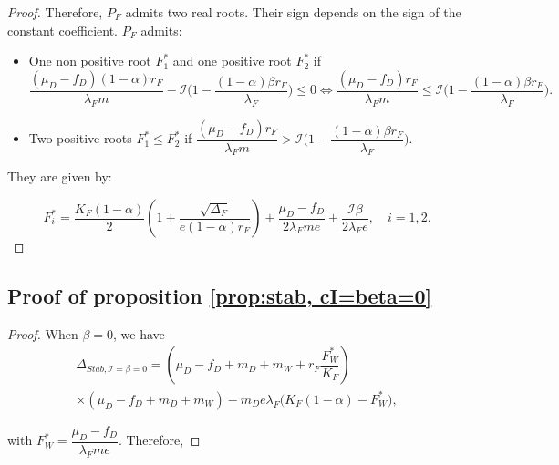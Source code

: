 \documentclass{article}
\newcommand{\lfw}{\lambda_{F}}
\newcommand{\lfw}{\lambda_{F}}
\newcommand{\cI}{\mathcal{I}}
\theoremstyle{definition}
\theoremstyle{remark}
\begin{document}
\begin{appendix}
\begin{proof}
Therefore, $P_F$ admits two real roots. Their sign depends on the sign of the constant coefficient. $P_F$ admits:
\begin{itemize}
\item One non positive root $F^*_1$ and one positive root $F^*_2$ if $$\dfrac{(\mu_D - f_D)(1-\alpha) r_F}{\lfw m} - \cI\Big(1 - \dfrac{(1-\alpha)\beta r_F}{\lfw} \Big) \leq 0 \Leftrightarrow \dfrac{(\mu_D - f_D) r_F}{\lfw m } \leq \cI\Big(1 - \dfrac{(1-\alpha)\beta r_F}{\lfw} \Big).$$
\item Two positive roots $F^*_1\leq  F^*_2$ if $\dfrac{(\mu_D - f_D) r_F}{\lfw m } > \cI\Big(1 - \dfrac{(1-\alpha)\beta r_F}{\lfw} \Big)$.
\end{itemize}
They are given by:

\begin{equation*}
F_i^* = \dfrac{K_F(1-\alpha)}{2}\left(1 \pm \dfrac{\sqrt{\Delta_F}}{e(1-\alpha)r_F}\right) + \dfrac{\mu_D - f_D}{2\lfw m e} + \dfrac{\cI \beta}{2\lfw e}, \quad i=1,2.
\end{equation*}
\end{proof}

\subsection{Proof of proposition \ref{prop:stab, cI=beta=0}} \label{sec:stab, cI = beta = 0}

\begin{proof}
When $\beta = 0$, we have
\begin{multline} \label{DeltaStab, generalCase}
\Delta_{Stab, \cI =\beta = 0} =  \left(\mu_D - f_D + m_D + m_W + r_F\dfrac{F_W^*}{K_F} \right) \\ \times   \left( \mu_D -f_D + m_D + m_W \right) - m_D e \lfw \Big(K_F(1-\alpha) - F_W^* \Big),
\end{multline}

with $F_W^* = \dfrac{\mu_D - f_D}{\lfw m e}$. Therefore,


\end{proof}
\end{appendix}
\end{document}
